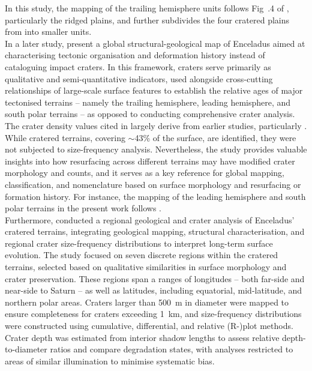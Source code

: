 \documentclass[preprint,11pt,3p,times,authoryear]{elsarticle}
\begin{document}
In this study, the mapping of the trailing hemisphere units follows Fig~.4 of \citet{Kirchoff2009}, particularly the ridged plains, and further subdivides the four cratered plains from \citet{Kirchoff2009} into smaller units.\\

In a later study, \citet{CrowWillard2015} present a global structural-geological map of Enceladus aimed at characterising tectonic organisation and deformation history instead of  cataloguing impact craters. In this framework, craters serve primarily as qualitative and semi-quantitative indicators, used alongside cross-cutting relationships of large-scale surface features to establish the relative ages of major tectonised terrains -- namely the trailing hemisphere, leading hemisphere, and south polar terrains -- as opposed to conducting comprehensive crater analysis. The crater density values cited in \citet{CrowWillard2015} largely derive from earlier studies, particularly \citet{Kirchoff2009}. While cratered terrains, covering $\sim$43\% of the surface, are identified, they were not subjected to size-frequency analysis. Nevertheless, the study provides valuable insights into how resurfacing across different terrains may have modified crater morphology and counts, and it serves as a key reference for global mapping, classification, and nomenclature based on surface morphology and resurfacing or formation history. For instance, the mapping of the leading hemisphere and south polar terrains in the present work follows \citet{CrowWillard2015}.\\

Furthermore, \citet{Kinczyk2024} conducted a regional geological and crater analysis of Enceladus’ cratered terrains, integrating geological mapping, structural characterisation, and regional crater size-frequency distributions to interpret long-term surface evolution. The study focused on seven discrete regions within the cratered terrains, selected based on qualitative similarities in surface morphology and crater preservation. These regions span a ranges of longitudes -- both far-side and near-side to Saturn -- as well as latitudes, including equatorial, mid-latitude, and northern polar areas. Craters larger than 500~m in diameter were mapped to ensure completeness for craters exceeding 1~km, and size-frequency distributions were constructed using cumulative, differential, and relative (R-)plot methods. Crater depth was estimated from interior shadow lengths to assess relative depth-to-diameter ratios and compare degradation states, with analyses restricted to areas of similar illumination to minimise systematic bias.\\
\end{document}
